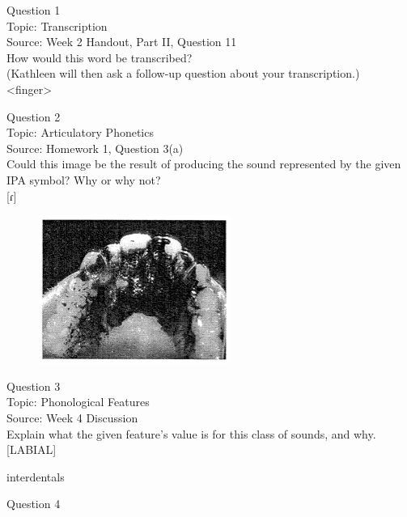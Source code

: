 \documentclass[12pt]{article}
\begin{document}
{\large Question 1}\\

Topic: Transcription\\
Source: Week 2 Handout, Part II, Question 11\\

How would this word be transcribed?\\ (Kathleen will then ask a follow-up question about your transcription.)\\

<finger>


\newpage

{\large Question 2}\\

Topic: Articulatory Phonetics\\
Source: Homework 1, Question 3(a)\\

Could this image be the result of producing the sound represented by the given IPA symbol? Why or why not?\\

{[ɾ]}

\begin{figure}[H]
\includegraphics{../images/staticpalatography_stop.png}
\end{figure}

\newpage

{\large Question 3}\\

Topic: Phonological Features\\
Source: Week 4 Discussion\\

Explain what the given feature’s value is for this class of sounds, and why.\\

{[LABIAL]}

interdentals


\newpage

{\large Question 4}\\
\end{document}
